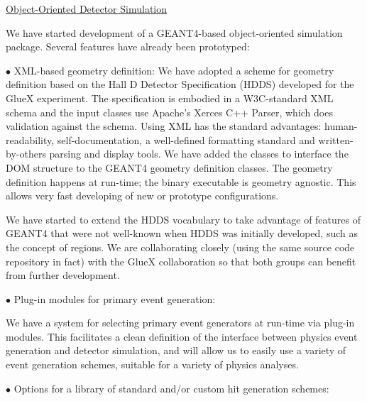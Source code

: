 \vskip 0.5cm

\noindent
\underline{Object-Oriented Detector Simulation}

We have started development of a GEANT4-based object-oriented simulation 
package. Several features have already been prototyped:

\vskip 0.5cm

\noindent
$\bullet$ XML-based geometry definition:
We have adopted a scheme for geometry definition based on the Hall D Detector 
Specification (HDDS) developed for the GlueX experiment. The specification is 
embodied in a W3C-standard XML schema and the input classes use Apache's 
Xerces C++ Parser, which does validation against the schema. Using XML has 
the standard advantages: human-readability, self-documentation, a well-defined 
formatting standard and written-by-others parsing and display tools. We have 
added the classes to interface the DOM structure to the GEANT4 geometry 
definition classes. The geometry definition happens at run-time; the binary 
executable is geometry agnostic. This allows very fast developing of new or 
prototype configurations.

We have started to extend the HDDS vocabulary to take advantage of features 
of GEANT4 that were not well-known when HDDS was initially developed, such 
as the concept of regions. We are collaborating closely (using the same 
source code repository in fact) with the GlueX collaboration so that both 
groups can benefit from further development.

\vskip 0.5cm

\noindent
$\bullet$ Plug-in modules for primary event generation:

We have a system for selecting primary event generators at run-time via 
plug-in modules. This facilitates a clean definition of the interface between 
physics event generation and detector simulation, and will allow us to easily 
use a variety of event generation schemes, suitable for a variety of physics 
analyses.

\vskip 0.3cm

\noindent
$\bullet$ Options for a library of standard and/or custom hit generation 
schemes:

